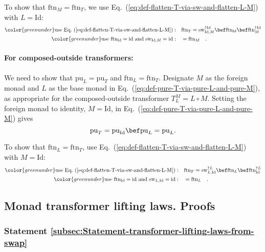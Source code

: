 To show that $\text{ftn}_{M}=\text{ftn}_{T}$, we use Eq.~(\ref{eq:def-flatten-T-via-sw-and-flatten-L-M})
with $L=\text{Id}$:
\begin{align*}
{\color{greenunder}\text{use Eq.~(\ref{eq:def-flatten-T-via-sw-and-flatten-L-M})}:}\quad & \text{ftn}_{T}=\text{sw}_{\text{Id},M}^{\uparrow\text{Id}}\bef\text{ftn}_{\text{Id}}\bef\text{ftn}_{M}^{\uparrow\text{Id}}\\
{\color{greenunder}\text{use }\text{ftn}_{\text{Id}}=\text{id}\text{ and }\text{sw}_{\text{Id},M}=\text{id}:}\quad & =\text{ftn}_{M}\quad.
\end{align*}


\paragraph{For composed-outside transformers:}

We need to show that $\text{pu}_{L}=\text{pu}_{T}$ and $\text{ftn}_{L}=\text{ftn}_{T}$.
Designate $M$ as the foreign monad and $L$ as the base monad in
Eq.~(\ref{eq:def-pure-T-via-pure-L-and-pure-M}), as appropriate
for the composed-outside transformer $T_{L}^{M}=L\circ M$. Setting
the foreign monad to identity, $M=\text{Id}$, in Eq.~(\ref{eq:def-pure-T-via-pure-L-and-pure-M})
gives
\[
\text{pu}_{T}=\text{pu}_{\text{Id}}\bef\text{pu}_{L}=\text{pu}_{L}.
\]

To show that $\text{ftn}_{L}=\text{ftn}_{T}$, use Eq.~(\ref{eq:def-flatten-T-via-sw-and-flatten-L-M})
with $M=\text{Id}$:
\begin{align*}
{\color{greenunder}\text{use Eq.~(\ref{eq:def-flatten-T-via-sw-and-flatten-L-M})}:}\quad & \text{ftn}_{T}=\text{sw}_{L,\text{Id}}^{\uparrow L}\bef\text{ftn}_{L}\bef\text{ftn}_{\text{Id}}^{\uparrow L}\\
{\color{greenunder}\text{use }\text{ftn}_{\text{Id}}=\text{id}\text{ and }\text{sw}_{L,\text{Id}}=\text{id}:}\quad & =\text{ftn}_{L}\quad.
\end{align*}


\subsection{Monad transformer lifting laws. Proofs}

\subsubsection{Statement \label{subsec:Statement-transformer-lifting-laws-from-swap}\ref{subsec:Statement-transformer-lifting-laws-from-swap}}


